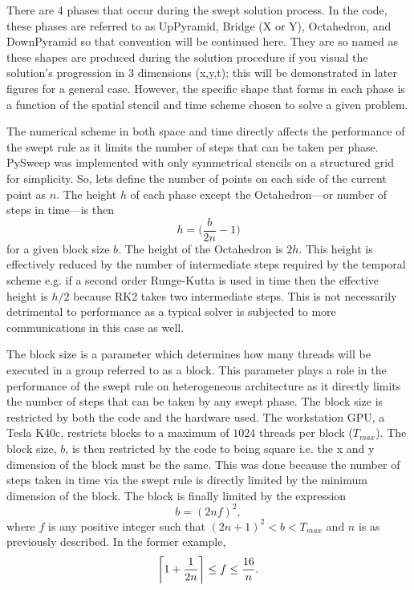\documentclass[review]{elsarticle}
\DeclarePairedDelimiter{\ceil}{\lceil}{\rceil}
\begin{document}
\par
There are 4 phases that occur during the swept solution process. In the code, these phases are referred to as UpPyramid, Bridge (X or Y), Octahedron, and DownPyramid so that convention will be continued here. They are so named as these shapes are produced during the solution procedure if you visual the solution's progression in 3 dimensions (x,y,t); this will be demonstrated in later figures for a general case. However, the specific shape that forms in each phase is a function of the spatial stencil and time scheme chosen to solve a given problem.  

\par
The numerical scheme in both space and time directly affects the performance of the swept rule as it limits the number of steps that can be taken per phase. PySweep was implemented with only symmetrical stencils on a structured grid for simplicity. So, lets define the number of points on each side of the current point as $n$. The height $h$ of each phase except the Octahedron---or number of steps in time---is then
\begin{equation}
    h = \bigg(\frac{b}{2n}-1\bigg)
\end{equation}
for a given block size $b$. The height of the Octahedron is $2h$. This height is effectively reduced by the number of intermediate steps required by the temporal scheme e.g. if a second order Runge-Kutta is used in time then the effective height is $h/2$ because RK2 takes two intermediate steps. This is not necessarily detrimental to performance as a typical solver is subjected to more communications in this case as well.

\par
The block size is a parameter which determines how many threads will be executed in a group referred to as a block. This parameter plays a role in the performance of the swept rule on heterogeneous architecture as it directly limits the number of steps that can be taken by any swept phase. The block size is restricted by both the code and the hardware used. The workstation GPU, a Tesla K40c, restricts blocks to a maximum of $1024$ threads per block ($T_{max}$).
The block size, $b$, is then restricted by the code to being square i.e. the x and y dimension of the block must be the same. This was done because the number of steps taken in time via the swept rule is directly limited by the minimum dimension of the block. The block is finally limited by the expression
\begin{equation}
    b  = (2nf)^2,
\end{equation}
where $f$ is any positive integer such that $(2n+1)^2 < b < T_{max}$ and $n$ is as previously described. In the former example,
\begin{equation}
  \ceil[\bigg]{1+\frac{1}{2n}} \leq f \leq \frac{16}{n}.
\end{equation}
\end{document}
